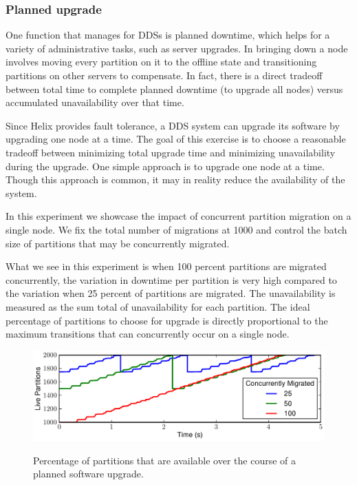 \subsubsection{Planned upgrade}
\label{sec:downtime}
%
One function that \helix manages for DDSs is planned downtime, which helps for a
variety of administrative tasks, such as server upgrades.  In \ES bringing down
a node involves moving every partition on it to the offline state and
transitioning partitions on other servers to compensate. In fact, there
is a direct tradeoff between total time to complete planned downtime (\eg to
upgrade all nodes) versus accumulated unavailability over that time. 

Since Helix provides fault tolerance, a DDS system can upgrade its software by upgrading one node at a time. 
The goal of this exercise is to choose a reasonable tradeoff between minimizing
total upgrade time and minimizing unavailability during the upgrade. 
One simple approach is to upgrade one node at a time. 
Though this approach is common, it may in reality reduce the availability of the
system. 

In this experiment we showcase the impact of concurrent partition migration on a
single node. We fix the total number of migrations at 1000 and control the
batch size of partitions that may be concurrently migrated. 

What we see in this experiment is when 100 percent partitions are migrated
 concurrently, the variation in downtime per partition is very high compared to
 the variation when 25 percent of partitions are migrated. The unavailability is
 measured as the sum total of unavailability for each partition. The ideal
 percentage of partitions to choose for upgrade is directly proportional to the
 maximum transitions that can concurrently occur on a single node.

\begin{figure}[t]
    {\includegraphics[width=\columnwidth]{migration-timeseries.pdf}}
    \vspace*{-2ex}
    \caption{\label{fig:migration_timeseries} Percentage of partitions that are
available over the course of a planned software upgrade.}
\end{figure}

